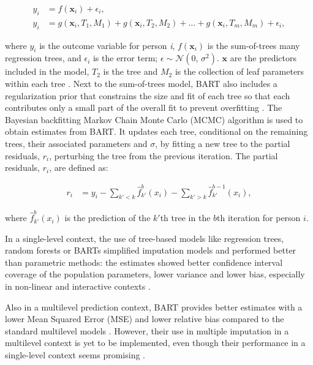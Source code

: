 \documentclass[10pt, a4paper, titlepage]{article}
\begin{document}
\begin{subequations}
\label{eq:BART}
\begin{align}
y_i &= f(\textbf{x}_i) + \epsilon_i, \tag{1.1} \\
y_i &= g(\textbf{x}_{i}, T_{1}, M_{1})+ g(\textbf{x}_{i}, T_{2}, M_{2}) + \dots + g(\textbf{x}_{i}, T_{m}, M_{m}) + \epsilon_i, \tag{1.2}
\end{align}
\end{subequations}

where $y_i$ is the outcome variable for person \textit{i}, $f(\textbf{x}_i)$ is the sum-of-trees many regression trees, and $\epsilon_i$ is the error term; $\epsilon \sim \mathcal{N}(0,\,\sigma^{2})$. $\textbf{x}$ are the predictors included in the model, $T_{2}$ is the tree and $M_{2}$ is the collection of leaf parameters within each tree \cite{chipman2010, hill2020, james2021}. Next to the sum-of-trees model, BART also includes a regularization prior that constrains the size and fit of each tree so that each contributes only a small part of the overall fit to prevent overfitting \cite{chipman2010, hill2020, james2021}. The Bayesian backfitting Markov Chain Monte Carlo (MCMC) algorithm is used to obtain estimates from BART. It updates each tree, conditional on the remaining trees, their associated parameters and $\sigma$, by fitting a new tree to the partial residuals, $r_{i}$, perturbing the tree from the previous iteration. The partial residuals, $r_{i}$, are defined as:

\begin{subequations}
\label{eq:partialresiduals}
\begin{align}
r_i &= y_i - \sum_{k' < k} \hat{f}^{b}_{k'}(x_{i}) - \sum_{k' > k} \hat{f}^{b-1}_{k'}(x_{i}), \tag{2}
\end{align}
\end{subequations}

where $\hat{f}^{b}_{k'}(x_{i})$ is the prediction of the $k'$th tree in the $b$th iteration for person $i$.

In a single-level context, the use of tree-based models like regression trees, random forests or BARTs simplified imputation models and performed better than parametric methods: the estimates showed better confidence interval coverage of the population parameters, lower variance and lower bias, especially in non-linear and interactive contexts \cite{burgette2010, xu2016, silva2022}.

Also in a multilevel prediction context, BART provides better estimates with a lower Mean Squared Error (MSE) and lower relative bias compared to the standard multilevel models \cite{wagner2020, chen2020}. However, their use in multiple imputation in a multilevel context is yet to be implemented, even though their performance in a single-level context seems promising \cite{burgette2010, xu2016}.
\end{document}
